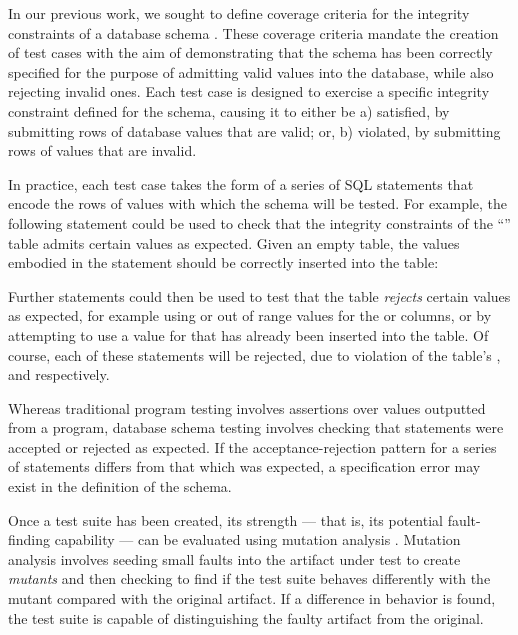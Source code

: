In our previous work, we sought to define coverage criteria for the integrity constraints of a database schema \cite{McMinn2015}. These coverage criteria mandate the creation of test cases with the aim of demonstrating that the schema has been correctly specified for the purpose of admitting valid values into the database, while also rejecting \mbox{invalid} ones. Each test case is designed to exercise a specific integrity constraint defined for the schema, causing it to either be a) satisfied, by submitting rows of database values that are valid; or, b) violated, by submitting rows of values that are invalid. 

In practice, each test case takes the form of a series of SQL \INSERT statements that encode the rows of values with which the schema will be tested. For example, the following \INSERT statement could be used to check that the integrity constraints of the ``'' table admits certain values as expected. Given an empty table, the values embodied in the statement should be correctly inserted into the table:

\vspace{-.25em}
\begin{center}
\end{center}
\vspace{-.25em}

Further \INSERT statements could then be used to test that the table {\it rejects} certain values as expected, for example using \NULL or out of range values for the  or  columns, or by attempting to use a value for  that has already been inserted into the table. Of course, each of these \INSERT statements will be rejected, due to violation of the table's \NOTNULL, \CHECK and \PKCs respectively. 

Whereas traditional program testing involves assertions over values outputted from a program, database schema testing involves checking that \INSERT statements were accepted or rejected as expected. If the acceptance-rejection pattern for a series of \INSERT statements differs from that which was expected, a specification error may exist in the definition of the schema.

Once a test suite has been created, its strength --- that is, its potential fault-finding capability --- can be evaluated using mutation analysis \cite{Jia2011}. Mutation analysis involves seeding small faults into the artifact under test to create {\it mutants} and then checking to find if the test suite behaves differently with the mutant compared with the original artifact. If a difference in behavior is found, the test suite is capable of distinguishing the faulty artifact from the original.


